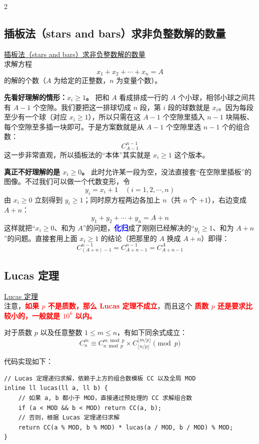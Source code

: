 \begin{multicols*}{2}
		\subsection{插板法（stars and bars）求非负整数解的数量}
		\href{https://www.notion.so/stars-and-bars-3294539447bd8055a9e7fa3cac84be9e}{插板法（stars and bars）求非负整数解的数量} \\
		求解方程
		$$x_1 + x_2 + \cdots + x_n = A$$
		的解的个数（$A$ 为给定的正整数，$n$ 为变量个数）。

		\textbf{先看好理解的情形：$x_i \ge 1$。} 把和 $A$ 看成排成一行的 $A$ 个小球，相邻小球之间共有 $A - 1$ 个空隙。我们要把这一排球切成 $n$ 段，第 $i$ 段的球数就是 $x_i$。因为每段至少有一个球（对应 $x_i \ge 1$），所以只需在这 $A - 1$ 个空隙里插入 $n - 1$ 块隔板、每个空隙至多插一块即可。于是方案数就是从 $A - 1$ 个空隙里选 $n - 1$ 个的组合数：
		$$C_{A - 1}^{n - 1}$$
		这一步非常直观，所以插板法的“本体”其实就是 $x_i \ge 1$ 这个版本。

		\textbf{真正不好理解的是 $x_i \ge 0$。} 此时允许某一段为空，没法直接套“在空隙里插板”的图像。不过我们可以做一个代数变形，令
		$$y_i = x_i + 1 \quad (i = 1, 2, \cdots, n)$$
		由 $x_i \ge 0$ 立刻得到 $y_i \ge 1$；同时原方程两边各加上 $n$（共 $n$ 个 $+1$），右边变成 $A + n$：
		$$y_1 + y_2 + \cdots + y_n = A + n$$
		这样就把“$x_i \ge 0$、和为 $A$”的问题，\textcolor{blue}{\textbf{化归}}成了刚刚已经解决的“$y_i \ge 1$、和为 $A + n$”的问题。直接套用上面 $x_i \ge 1$ 的结论（把那里的 $A$ 换成 $A + n$）即得：
		$$C_{(A + n) - 1}^{n - 1} = C_{A + n - 1}^{n - 1} = C_{A + n - 1}^{A}$$

		\subsection{Lucas 定理}
		\href{https://www.notion.so/Lucas-3394539447bd804eaaeed232c7f86b4e}{Lucas 定理} \\
		注意，\textcolor{red}{\textbf{如果 $p$ 不是质数，那么 Lucas 定理不成立}}，而且这个 \textcolor{red}{\textbf{质数 $p$ 还是要求比较小的，一般就是 $10^6$ 以内。}}

		对于质数 $p$ 以及任意整数 $1 \le m \le n$，有如下同余式成立：
		$$C_{n}^{m} \equiv C_{n \bmod p}^{m \bmod p} \times C_{\lfloor n / p \rfloor}^{\lfloor m / p \rfloor} \pmod p$$

		代码实现如下：

		\begin{verbatim}
// Lucas 定理递归求解，依赖于上方的组合数模板 CC 以及全局 MOD
inline ll lucas(ll a, ll b) {
	// 如果 a, b 都小于 MOD，直接通过预处理的 CC 求解组合数
	if (a < MOD && b < MOD) return CC(a, b);
	// 否则，根据 Lucas 定理递归求解
	return CC(a % MOD, b % MOD) * lucas(a / MOD, b / MOD) % MOD;
}
		\end{verbatim}


\end{multicols*}

